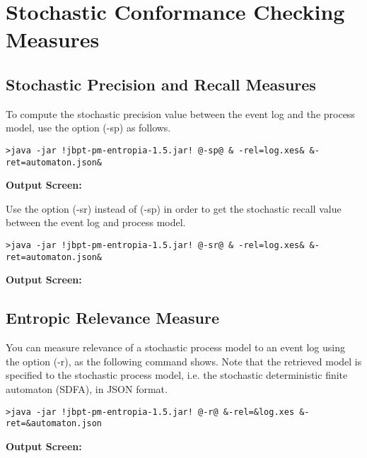 \section*{Stochastic Conformance Checking Measures}
\setcounter{subsection}{0}
\subsection{Stochastic Precision and Recall Measures}
To compute the stochastic precision value between the event log and the process model, use the option (\textcolor{darkcandyapplered}{\footnotesize\ttfamily-sp}) as follows.
\begin{lstlisting}[style=CL]
>java -jar !jbpt-pm-entropia-1.5.jar! @-sp@ & -rel=log.xes& &-ret=automaton.json&
\end{lstlisting}
\textbf{Output Screen:}%


Use the option (\textcolor{darkcandyapplered}{\footnotesize\ttfamily-sr}) instead of (\textcolor{darkcandyapplered}{\footnotesize\ttfamily-sp}) in order to get the stochastic recall value between the event log and process model. 
\begin{lstlisting}[style=CL]
>java -jar !jbpt-pm-entropia-1.5.jar! @-sr@ & -rel=log.xes& &-ret=automaton.json&
\end{lstlisting}
\textbf{Output Screen:}%

\subsection{Entropic Relevance Measure}
You can measure relevance of a stochastic process model to an event log using the option (\textcolor{darkcandyapplered}{\footnotesize\ttfamily-r}), as the following command shows. Note that the retrieved model is specified to the stochastic process model, i.e. the stochastic deterministic finite automaton (SDFA), in JSON format.

\begin{lstlisting}[style=CL]
>java -jar !jbpt-pm-entropia-1.5.jar! @-r@ &-rel=&log.xes &-ret=&automaton.json
\end{lstlisting}
\textbf{Output Screen:}%

